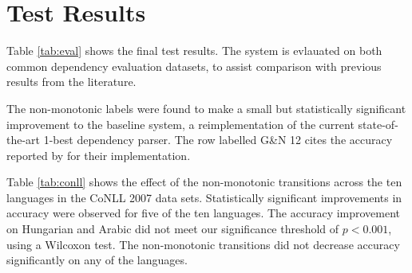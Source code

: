 \documentclass[11pt,letterpaper]{article}
\newcommand{\uas}{\textsc{uas}\xspace}
\begin{document}
\section{Test Results}

Table \ref{tab:eval} shows the final test results. The system is evlauated on
both common dependency evaluation datasets, to assist comparison with previous
results from the literature.

The non-monotonic labels were found to make a small but statistically significant
improvement to the baseline system, a reimplementation of the current state-of-the-art
1-best dependency parser. The row labelled G\&N 12 cites the accuracy reported by
\citet{goldberg:12} for their implementation.

Table \ref{tab:conll} shows the effect of the non-monotonic transitions across
the ten languages in the CoNLL 2007 data sets. Statistically significant improvements
in accuracy were observed for five of the ten languages. The accuracy improvement
on Hungarian and Arabic did not meet our significance threshold of $p < 0.001$,
using a Wilcoxon test. The non-monotonic transitions did not decrease accuracy
significantly on any of the languages.

\end{document}
